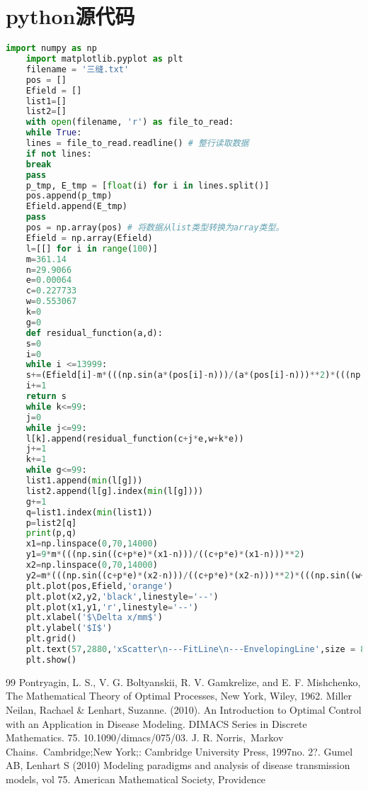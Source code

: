 \documentclass[UTF8]{ctexart}
\begin{document}
\section{python源代码}
\begin{lstlisting}[language=python]
	import numpy as np
	import matplotlib.pyplot as plt
	filename = '三缝.txt'
	pos = []
	Efield = []
	list1=[]
	list2=[]
	with open(filename, 'r') as file_to_read:
	while True:
	lines = file_to_read.readline() # 整行读取数据
	if not lines:
	break
	pass
	p_tmp, E_tmp = [float(i) for i in lines.split()] 
	pos.append(p_tmp)  
	Efield.append(E_tmp)
	pass
	pos = np.array(pos) # 将数据从list类型转换为array类型。
	Efield = np.array(Efield)
	l=[[] for i in range(100)]
	m=361.14
	n=29.9066
	e=0.00064
	c=0.227733
	w=0.553067
	k=0
	g=0
	def residual_function(a,d):
	s=0
	i=0
	while i <=13999:
	s+=(Efield[i]-m*(((np.sin(a*(pos[i]-n)))/(a*(pos[i]-n)))**2)*(((np.sin(d*3*(pos[i]-n)))/(np.sin(d*(pos[i]-n))))**2))**2
	i+=1
	return s
	while k<=99:
	j=0
	while j<=99:
	l[k].append(residual_function(c+j*e,w+k*e))
	j+=1
	k+=1
	while g<=99:
	list1.append(min(l[g]))
	list2.append(l[g].index(min(l[g])))
	g+=1
	q=list1.index(min(list1))
	p=list2[q]
	print(p,q)
	x1=np.linspace(0,70,14000)
	y1=9*m*(((np.sin((c+p*e)*(x1-n)))/((c+p*e)*(x1-n)))**2)
	x2=np.linspace(0,70,14000)
	y2=m*(((np.sin((c+p*e)*(x2-n)))/((c+p*e)*(x2-n)))**2)*(((np.sin((w+q*e)*3*(x2-n)))/(np.sin((w+q*e)*(x2-n))))**2)
	plt.plot(pos,Efield,'orange')
	plt.plot(x2,y2,'black',linestyle='--')
	plt.plot(x1,y1,'r',linestyle='--')
	plt.xlabel('$\Delta x/mm$')
	plt.ylabel('$I$')
	plt.grid()
	plt.text(57,2880,'xScatter\n---FitLine\n---EnvelopingLine',size = 8,family = "fantasy",style = "italic",bbox = dict(alpha = 0.2))
	plt.show()      
\end{lstlisting}
	\begin{thebibliography}{99}  
		Pontryagin, L. S., V. G. Boltyanskii, R. V. Gamkrelize, and E. F. Mishchenko, The Mathematical
		Theory of Optimal Processes, New York, Wiley, 1962.
		Miller Neilan, Rachael \& Lenhart, Suzanne. (2010). An Introduction to Optimal Control with an Application in Disease Modeling. DIMACS Series in Discrete Mathematics. 75. 10.1090/dimacs/075/03. 
		J. R. Norris, Markov Chains. Cambridge;New York;: Cambridge University Press, 1997no. 2?.
		Gumel AB, Lenhart S (2010) Modeling paradigms and analysis of disease transmission models, vol 75. American Mathematical Society, Providence
	\end{thebibliography}
\end{document}
